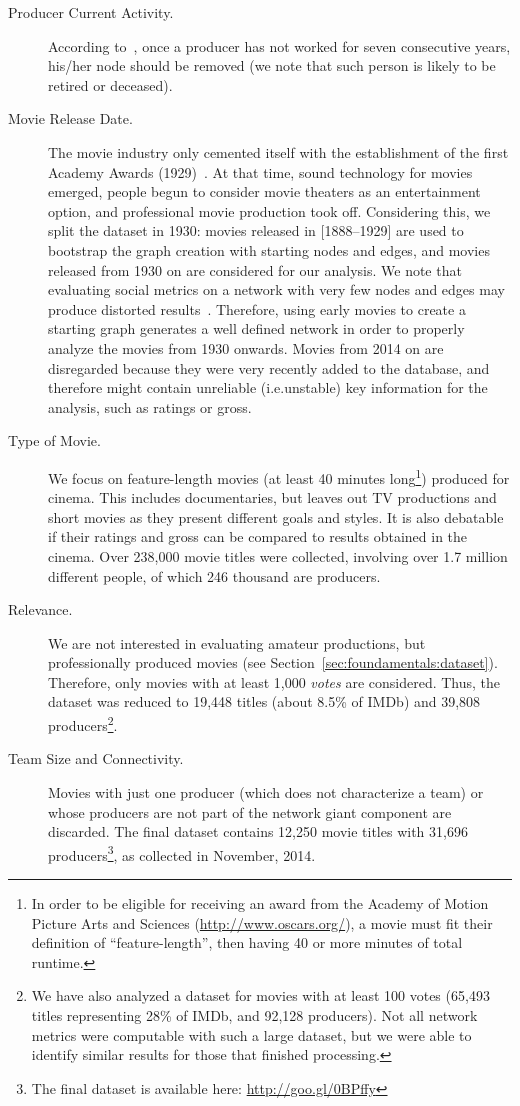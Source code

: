 \begin{description}
\item [Producer Current Activity.] According to~\cite{uzzi2005collaboration},
once a producer has not worked for seven consecutive years, his/her node should
be removed (we note that such person is likely to be retired or deceased).
\item [Movie Release Date.] The movie industry only cemented itself with the
establishment of the first Academy Awards
(1929)~\citep{bakker2008entertainment}. At that time, sound technology for
movies emerged, people begun to consider movie theaters as an entertainment
option, and professional movie production took off. Considering this, we split
the dataset in 1930: movies released in [1888--1929] are used to bootstrap the
graph creation with starting nodes and edges, and movies released from 1930 on
are considered for our analysis. We note that evaluating social metrics on a
network with very few nodes and edges may produce distorted
results~\citep{newman2010networks}.  Therefore, using early movies to create a
starting graph generates a well defined network in order to properly analyze
the movies from 1930 onwards.  Movies from 2014 on are disregarded because they
were very recently added to the database, and therefore might contain
unreliable (i.e.\@ unstable) key information for the analysis, such as ratings or
gross.
\item [Type of Movie.] We focus on feature-length movies (at least 40 minutes
long\footnote{In order to be eligible for receiving an award from the Academy
of Motion Picture Arts and Sciences (\url{http://www.oscars.org/}), a movie
must fit their definition of ``feature-length'', then having 40 or more minutes
of total runtime.}) produced for cinema. This includes documentaries, but
leaves out TV productions and short movies as they present different goals and
styles.  It is also debatable if their ratings and gross can be compared to
results obtained in the cinema. Over 238,000 movie titles were collected,
involving over 1.7 million different people, of which 246 thousand are
producers.
\item [Relevance.] We are not interested in evaluating amateur productions,
but professionally produced movies (see
Section~\ref{sec:foundamentals:dataset}). Therefore, only movies with at least
1,000 \textit{votes} are considered. Thus, the dataset was reduced to 19,448
titles (about 8.5\% of IMDb) and 39,808 producers\footnote{We have also
analyzed a dataset for movies with at least 100 votes (65,493 titles
representing 28\% of IMDb, and 92,128 producers). Not all network
metrics were computable with such a large dataset, but we were able to identify
similar results for those that finished processing.}.
\item [Team Size and Connectivity.] Movies with just one producer (which does
not characterize a team) or whose producers are not part of the network giant
component are discarded. The final dataset contains 12,250 movie titles with
31,696 producers\footnote{The final dataset is available here:
\url{http://goo.gl/0BPffy}}, as collected in November, 2014.
\end{description}

